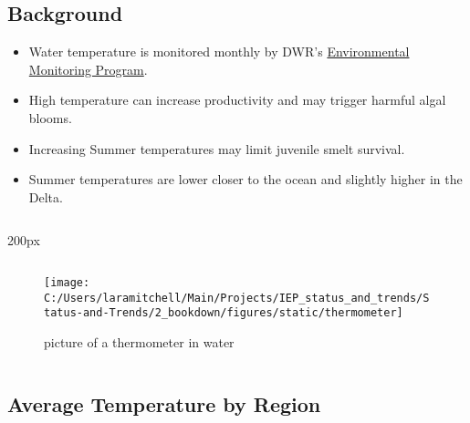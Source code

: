 \documentclass[
]{book}
\providecommand{\tightlist}{%
  \setlength{\itemsep}{0pt}\setlength{\parskip}{0pt}}
\begin{document}
\begin{columns-nocenter}

\begin{column}{0.7\textwidth}
\begin{column}

\hypertarget{background-1}{%
\subsection{Background}\label{background-1}}

\begin{itemize}
\tightlist
\item
  Water temperature is monitored monthly by DWR's \href{https://emp.baydeltalive.com/wiki/12297}{Environmental Monitoring Program}.
\item
  High temperature can increase productivity and may trigger harmful algal blooms.
\item
  Increasing Summer temperatures may limit juvenile smelt survival.
\item
  Summer temperatures are lower closer to the ocean and slightly higher in the Delta.
\end{itemize}

\end{column}
\end{column}

\begin{column}{200px\textwidth}
\begin{column}

\begin{figure}

{\centering \texttt{[image: C:/Users/laramitchell/Main/Projects/IEP\_status\_and\_trends/Status-and-Trends/2\_bookdown/figures/static/thermometer]} 

}

\caption{picture of a thermometer in water}\label{fig:unnamed-chunk-55}
\end{figure}

\end{column}
\end{column}

\end{columns-nocenter}

\hypertarget{average-temperature-by-region}{%
\subsection{Average Temperature by Region}\label{average-temperature-by-region}}
\end{document}
